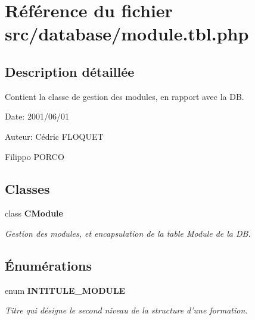 \section{Référence du fichier src/database/module.tbl.php}
\label{module_8tbl_8php}


\subsection{Description détaillée}
Contient la classe de gestion des modules, en rapport avec la DB. 

\begin{Desc}
\item[Date:]2001/06/01\end{Desc}
\begin{Desc}
\item[Auteur:]Cédric FLOQUET 

Filippo PORCO \end{Desc}


\subsection*{Classes}
\begin{CompactItemize}
\item 
class {\bf CModule}
\begin{CompactList}\small\item\em Gestion des modules, et encapsulation de la table Module de la DB. \item\end{CompactList}\end{CompactItemize}
\subsection*{Énumérations}
\begin{CompactItemize}
\item 
enum {\bf INTITULE\_\-MODULE} 
\begin{CompactList}\small\item\em Titre qui désigne le second niveau de la structure d'une formation. \item\end{CompactList}\end{CompactItemize}

